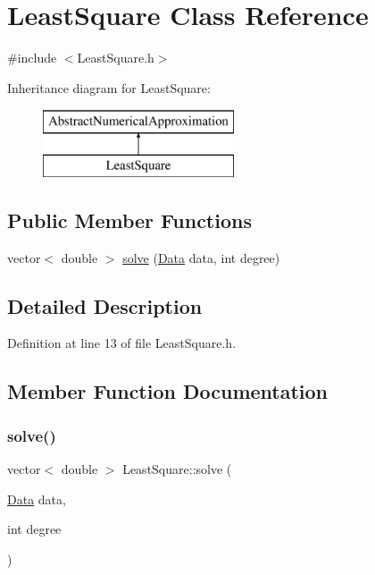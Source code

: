 \hypertarget{class_least_square}{}\section{Least\+Square Class Reference}
\label{class_least_square}


{\ttfamily \#include $<$Least\+Square.\+h$>$}

Inheritance diagram for Least\+Square\+:\begin{figure}[H]
\begin{center}
\leavevmode
\includegraphics[height=2.000000cm]{class_least_square}
\end{center}
\end{figure}
\subsection*{Public Member Functions}
\begin{DoxyCompactItemize}
\item 
vector$<$ double $>$ \mbox{\hyperlink{class_least_square_a2b7fa86ea095978386781192d3f44de7}{solve}} (\mbox{\hyperlink{struct_data}{Data}} data, int degree)
\end{DoxyCompactItemize}


\subsection{Detailed Description}


Definition at line 13 of file Least\+Square.\+h.



\subsection{Member Function Documentation}
\mbox{\label{class_least_square_a2b7fa86ea095978386781192d3f44de7}} 
\subsubsection{\texorpdfstring{solve()}{solve()}}
{\footnotesize\ttfamily vector$<$ double $>$ Least\+Square\+::solve (\begin{DoxyParamCaption}\item[{\mbox{\hyperlink{struct_data}{Data}}}]{data,  }\item[{int}]{degree }\end{DoxyParamCaption})}



